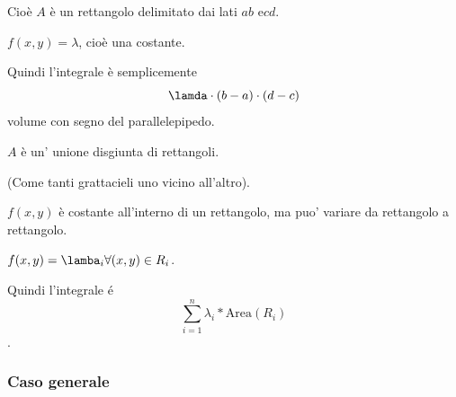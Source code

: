 Cioè $A$ è un rettangolo delimitato dai lati $ab$ e$cd$.

$f(x,y) = \lambda$, cioè una costante.

Quindi l'integrale è semplicemente $$\lamda \cdot (b-a) \cdot (d-c)$$ volume con segno del parallelepipedo.
 

$A$ è un' unione disgiunta di rettangoli.

(Come tanti grattacieli uno vicino all'altro).

$f(x,y)$ è costante all'interno di un rettangolo, ma puo' variare da rettangolo a rettangolo.

$f(x,y) = \lamba_i \forall (x,y) \in R_i$.

Quindi l'integrale é $$\sum_{i=1}^{n} \lambda_i * \text{Area}(R_i)$$.

\subsubsection{Caso generale}




